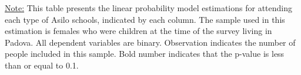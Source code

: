 \begin{footnotesize}
\noindent\underline{Note:} This table presents the linear probability model estimations for attending each type of Asilo schools, indicated by each column. The sample used in this estimation is females who were children at the time of the survey living in Padova. All dependent variables are binary. Observation indicates the number of people included in this sample. Bold number indicates that the p-value is less than or equal to 0.1.
\end{footnotesize}
